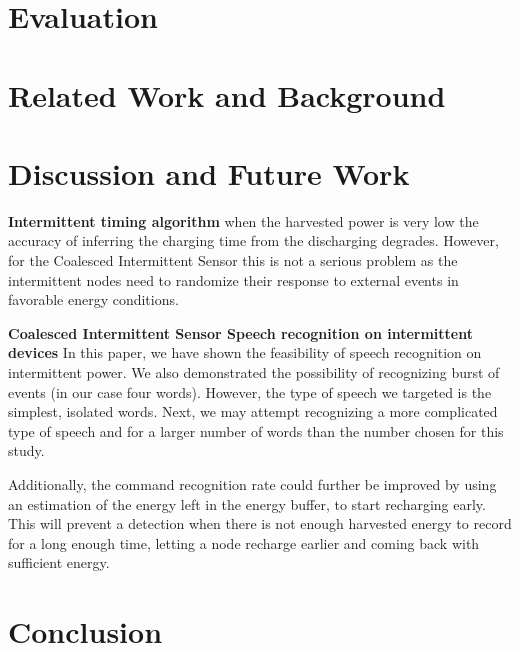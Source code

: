 \documentclass[sigconf, anonymous]{acmart}
\newcommand{\todo}[1]{}
\renewcommand{\todo}[1]{{\color{red} [{#1}]}}
\newcommand{\fullcis}{Coalesced Intermittent Sensor\xspace}
\begin{document}
\section{Evaluation}
\label{sec:evaluation}


\section{Related Work and Background}
\label{sec:relatedwork}


\section{Discussion and Future Work}
\label{sec:discussion}


\noindent\textbf{Intermittent timing algorithm} when the harvested power is very low the accuracy of inferring the charging time from the discharging degrades. However, for the \fullcis this is not a serious problem as the intermittent nodes need to randomize their response to external events in favorable energy conditions. 


\noindent\textbf{\fullcis Speech recognition on intermittent devices} In this paper, we have shown the feasibility of speech recognition on intermittent power. We also demonstrated the possibility of recognizing burst of events (in our case four words). However, the type of speech we targeted is the simplest, isolated words. Next, we may attempt recognizing a more complicated type of speech and for a larger number of words than the number chosen for this study.

Additionally, the command recognition rate could further be improved by using an estimation of the energy left in the energy buffer, to start recharging early. This will prevent a detection when there is not enough harvested energy to record for a long enough time, letting a node recharge earlier and coming back with sufficient energy.

\section{Conclusion}





\end{document}
